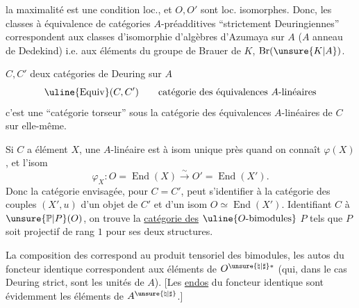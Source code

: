 la maximalité est une condition loc., et $O,O'$ sont loc. isomorphes. Donc, les classes  à équivalence  de catégories $A$-préadditives ``strictement Deuringiennes'' correspondent aux classes d'isomorphie d'algèbres d'Azumaya  sur $A$ ($A$ anneau de Dedekind) i.e. aux éléments du groupe de Brauer de $K$, $\operatorname{Br}(\unsure{K|A})$.

$C,C'$ deux catégories de Deuring sur $A$
\[
\uline{\operatorname{Equiv}}(C,C')\qquad\text{catégorie des équivalences }A\text{-linéaires}
\]
 c'est une ``catégorie torseur'' sous la catégorie des équivalences $A$-linéaires de $C$ sur elle-même.

Si $C$ a élément $X$, une   $A$-linéaire \deleted{\unsure{\varphi}}  est  à isom unique près quand on connaît  $\varphi(X)$, et l'isom
\[
\varphi_X:O=\operatorname{End}(X)\xrightarrow{\sim}O'=\operatorname{End}(X').
\]
Donc la catégorie envisagée, pour $C=C'$, peut s'identifier à la catégorie des couples $(X',u)$ d'un objet de $C'$ et d'un isom  $O\simeq\operatorname{End}(X')$.
Identifiant $C$ à $\unsure{\mathbb P|P}(O)$, on trouve la \uline{catégorie des} $\uline{O\text{-bimodules}}$ $P$ tels que $P$ soit projectif de rang $1$ pour ses deux structures.

La composition des   correspond au produit tensoriel des bimodules, les autos du foncteur identique correspondent aux éléments de $O^{\unsure{\natural|\sharp}*}$ (qui, dans le cas Deuring strict, sont les unités de $A$). [Les \uline{endos} du foncteur identique sont évidemment les éléments de $A^{\unsure{\natural|\sharp}}$.]
